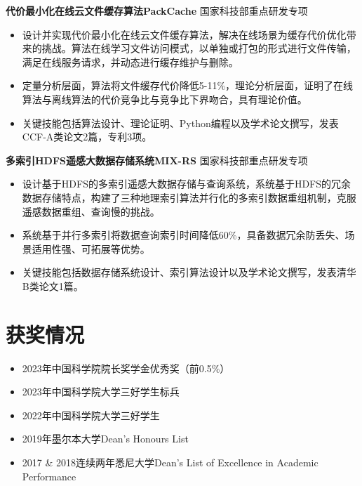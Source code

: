\documentclass[UTF8,letterpaper,11pt]{article}
\begin{document}
\vspace{1pt}

\textbf{代价最小化在线云文件缓存算法PackCache} \hfill 国家科技部重点研发专项

\begin{itemize}
  \setlength\itemsep{2pt}
  \item 设计并实现代价最小化在线云文件缓存算法，解决在线场景为缓存代价优化带来的挑战。算法在线学习文件访问模式，以单独或打包的形式进行文件传输，满足在线服务请求，并动态进行缓存维护与删除。
  \item 定量分析层面，算法将文件缓存代价降低5-11\%，理论分析层面，证明了在线算法与离线算法的代价竞争比与竞争比下界吻合，具有理论价值。
  \item 关键技能包括算法设计、理论证明、Python编程以及学术论文撰写，发表CCF-A类论文2篇，专利3项。
\end{itemize}

\vspace{1pt}

\textbf{多索引HDFS遥感大数据存储系统MIX-RS} \hfill 国家科技部重点研发专项

\begin{itemize}
  \setlength\itemsep{2pt}
  \item 设计基于HDFS的多索引遥感大数据存储与查询系统，系统基于HDFS的冗余数据存储特点，构建了三种地理索引算法并行化的多索引数据重组机制，克服遥感数据重组、查询慢的挑战。
  \item 系统基于并行多索引将数据查询索引时间降低60\%，具备数据冗余防丢失、场景适用性强、可拓展等优势。
  \item 关键技能包括数据存储系统设计、索引算法设计以及学术论文撰写，发表清华B类论文1篇。
\end{itemize}




\section{\textbf{获奖情况}}
\vspace{-5mm}
\begin{multicols}{2}
\begin{itemize}
  \setlength\itemsep{2pt}
  \item 2023年中国科学院院长奖学金优秀奖（前0.5\%）
  \item 2023年中国科学院大学三好学生标兵
  \item 2022年中国科学院大学三好学生
  \item 2019年墨尔本大学Dean's Honours List
  \item 2017 \& 2018连续两年悉尼大学Dean's List of Excellence in Academic Performance
\end{itemize}
\end{multicols}
\end{document}
